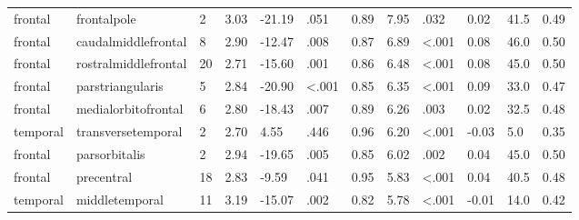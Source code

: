 \documentclass{article}
\begin{document}
\begin{longtable}{llR{1.5cm}R{1cm}R{1.3cm}R{1cm}R{1cm}R{1.3cm}R{1cm}R{1.8cm}R{1.3cm}R{1.8cm}}
\bottomrule
\endlastfoot
   frontal &               frontalpole &            2 &                  3.03 &           -21.19 &               .051 &                               0.89 &                          7.95 &                            .032 &  0.02 &   41.5 &      0.49 \\
   frontal &       caudalmiddlefrontal &            8 &                  2.90 &           -12.47 &               .008 &                               0.87 &                          6.89 &                   \textless.001 &  0.08 &   46.0 &      0.50 \\
   frontal &      rostralmiddlefrontal &           20 &                  2.71 &           -15.60 &               .001 &                               0.86 &                          6.48 &                   \textless.001 &  0.08 &   45.0 &      0.50 \\
   frontal &          parstriangularis &            5 &                  2.84 &           -20.90 &      \textless.001 &                               0.85 &                          6.35 &                   \textless.001 &  0.09 &   33.0 &      0.47 \\
   frontal &       medialorbitofrontal &            6 &                  2.80 &           -18.43 &               .007 &                               0.89 &                          6.26 &                            .003 &  0.02 &   32.5 &      0.48 \\
  temporal &        transversetemporal &            2 &                  2.70 &             4.55 &               .446 &                               0.96 &                          6.20 &                   \textless.001 & -0.03 &    5.0 &      0.35 \\
   frontal &             parsorbitalis &            2 &                  2.94 &           -19.65 &               .005 &                               0.85 &                          6.02 &                            .002 &  0.04 &   45.0 &      0.50 \\
   frontal &                precentral &           18 &                  2.83 &            -9.59 &               .041 &                               0.95 &                          5.83 &                   \textless.001 &  0.04 &   40.5 &      0.48 \\
  temporal &            middletemporal &           11 &                  3.19 &           -15.07 &               .002 &                               0.82 &                          5.78 &                   \textless.001 & -0.01 &   14.0 &      0.42 \\

\end{longtable}
\end{document}
